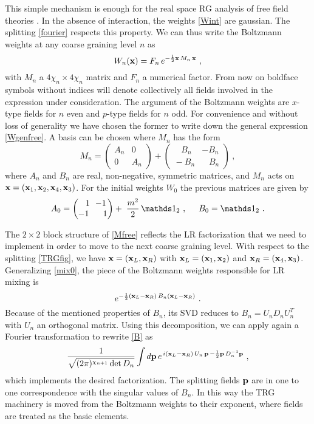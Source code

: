 \documentclass[a4paper,preprintnumbers,nofootinbib,twocolumn]{quantumarticle}
\newcommand{\be}{\begin{equation}} \newcommand{\ee}{\end{equation}}
\newcommand{\id}{\mathds 1}
\begin{document}
This simple mechanism is enough for the real space RG analysis of free field theories \cite{CS19}. In the absence of interaction, the weights \eqref{Wint} are
gaussian. The splitting \eqref{fourier} respects this property. We can thus write the Boltzmann weights at any coarse graining level $n$ as
\be
W_n({\bf x})= F_n \, e^{-{1 \over 2} {\bf x} \, M_n \, {\bf x}} \ ,
\label{Wgenfree}
\ee
with $M_n$ a $4 \chi_n \times 4 \chi_n$ matrix and $F_n$ a numerical factor.
From now on boldface symbols without indices will denote collectively all fields involved in the expression under consideration.
The argument of the Boltzmann weights are $x$-type fields for $n$ even and  $p$-type fields for $n$ odd. For convenience and without loss of generality we have chosen the former 
to write down the general expression \eqref{Wgenfree}.  
A basis can be chosen  \cite{CS19} where $M_n$ has the form 
\be
M_n=\begin{pmatrix} A_n & 0 \\
                              0 & A_n \end{pmatrix} +  \begin{pmatrix}\;\;\;B_n  & -B_n \\
                                   \!\!  -B_n & \;\;\;B_n \end{pmatrix} \ ,                                    
\label{Mfree}                                  
\ee                   
where $A_n$ and $B_n$ are real, non-negative, symmetric matrices, and $M_n$ acts on ${\bf x}=({\bf x}_1,{\bf x}_2,{\bf x}_4,{\bf x}_3)$. 
For the initial weights $W_0$ the previous matrices are given by
\be
A_0=\begin{pmatrix} \;\;\;1& \!\!\!-1 \\
                             \! -1 &\;\; 1 \end{pmatrix} + \;{m^2 \over 2} \, \id_2
                               \ , \hspace{5mm}  B_0= \id_2 \ .
\label{A0B0}                               
\ee  


The $2 \times 2 $ block structure of \eqref{Mfree} reflects the LR factorization that we need to implement in order to move to the next coarse graining level.
With respect to the splitting \eqref{TRGfig}, we have ${\bf x}=({\bf x}_L,{\bf x}_R)$ with ${\bf x}_L=({\bf x}_1,{\bf x}_2)$ and ${\bf x}_R=({\bf x}_4,{\bf x}_3)$.
Generalizing \eqref{mix0}, the piece of the Boltzmann weights responsible for LR mixing is
\be
e^{-{1 \over 2} ({\bf x}_L-{\bf x}_R)\, B_n ({\bf x}_L-{\bf x}_R)} \ .
\label{B}
\ee
Because of the mentioned properties of $B_n$,
its SVD reduces to $B_n=U_n D_n U_n^T$ with $U_n$ an orthogonal matrix.
Using this decomposition, we can apply again a Fourier transformation  to  rewrite  \eqref{B} as
\be
{1 \over \sqrt{(2\pi)^{\chi_{n+1}} \det D_n}} \int d {\bf p} \, e^{\,i ({\bf x}_L-{\bf x}_R)\, U_n \,{\bf p}\, -{1 \over 2} {\bf p} \, D_n^{-1} {\bf p}} \ ,
\label{fourier2}
\ee
which implements the desired factorization. 
The splitting fields ${\bf p}$ are in one to one correspondence with the singular values of $B_n$.
In this way the TRG machinery is moved from the Boltzmann weights to their exponent, where fields are treated as the basic elements. 
\end{document}
